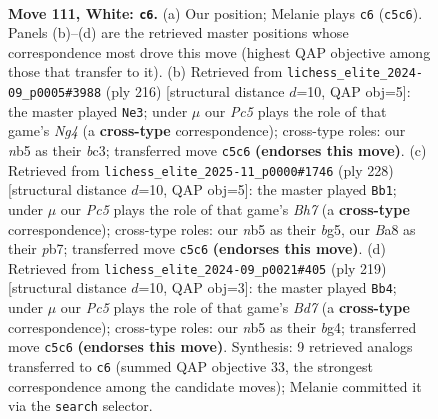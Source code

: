 \documentclass[11pt]{article}
\begin{document}
\clearpage

\begin{figure}[p]\centering
\begin{subfigure}{0.46\textwidth}\centering
\resizebox{\linewidth}{!}{%
\newchessgame
\chessboard[
  setfen={B7/6k1/8/1nP3P1/6KP/8/8/8 w - - 3 111},
  showmover=false,
  pgfstyle=straightmove, color=movearrow, markmove={c5-c6}
]}
\caption{}
\end{subfigure}\hfill
\begin{subfigure}{0.46\textwidth}\centering
\resizebox{\linewidth}{!}{%
\newchessgame
\chessboard[
  setfen={8/8/8/2k5/P5N1/KPb5/8/8 w - - 47 109},
  showmover=false,
  pgfstyle=straightmove, color=movearrow, markmove={g4-e3}
]}
\caption{}
\end{subfigure}
\\[4pt]
\begin{subfigure}{0.46\textwidth}\centering
\resizebox{\linewidth}{!}{%
\newchessgame
\chessboard[
  setfen={1k6/1p5B/3P4/2PK2b1/8/8/8/8 w - - 29 115},
  showmover=false,
  pgfstyle=straightmove, color=movearrow, markmove={h7-b1}
]}
\caption{}
\end{subfigure}\hfill
\begin{subfigure}{0.46\textwidth}\centering
\resizebox{\linewidth}{!}{%
\newchessgame
\chessboard[
  setfen={8/4k3/5p2/3K2p1/6B1/8/3b4/8 b - - 27 110},
  showmover=false,
  pgfstyle=straightmove, color=movearrow, markmove={d2-b4}
]}
\caption{}
\end{subfigure}
\caption{\textbf{Move 111, White: \texttt{c6}.} (a) Our position; Melanie plays \texttt{c6} (\texttt{c5c6}). Panels (b)--(d) are the retrieved master positions whose correspondence most drove this move (highest QAP objective among those that transfer to it). (b) Retrieved from \texttt{lichess\_elite\_2024-09\_p0005\#3988} (ply 216) [structural distance $d$=10, QAP obj=5]: the master played \texttt{Ne3}; under $\mu$ our \emph{Pc5} plays the role of that game's \emph{Ng4} (a \textbf{cross-type} correspondence); cross-type roles: our \emph{n}b5 as their \emph{b}c3; transferred move \texttt{c5c6} \textbf{(endorses this move)}. (c) Retrieved from \texttt{lichess\_elite\_2025-11\_p0000\#1746} (ply 228) [structural distance $d$=10, QAP obj=5]: the master played \texttt{Bb1}; under $\mu$ our \emph{Pc5} plays the role of that game's \emph{Bh7} (a \textbf{cross-type} correspondence); cross-type roles: our \emph{n}b5 as their \emph{b}g5, our \emph{B}a8 as their \emph{p}b7; transferred move \texttt{c5c6} \textbf{(endorses this move)}. (d) Retrieved from \texttt{lichess\_elite\_2024-09\_p0021\#405} (ply 219) [structural distance $d$=10, QAP obj=3]: the master played \texttt{Bb4}; under $\mu$ our \emph{Pc5} plays the role of that game's \emph{Bd7} (a \textbf{cross-type} correspondence); cross-type roles: our \emph{n}b5 as their \emph{b}g4; transferred move \texttt{c5c6} \textbf{(endorses this move)}. Synthesis: 9 retrieved analogs transferred to \texttt{c6} (summed QAP objective 33, the strongest correspondence among the candidate moves); Melanie committed it via the \texttt{search} selector.}
\label{fig:thought-m220}
\end{figure}
\end{document}

